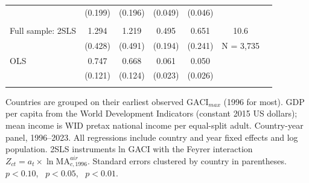 \begin{table}[p]
\begin{threeparttable}
\begin{tabular}{lcccccc}
 & (0.199) & (0.196) & (0.049) & (0.046) & \\
\addlinespace
\multicolumn{6}{l}{\emph{Reference}}\\
Full sample: 2SLS & 1.294\sym{***} & 1.219\sym{**} & 0.495\sym{**} & 0.651\sym{***} & 10.6 \\
 & (0.428) & (0.491) & (0.194) & (0.241) & N = 3{,}735 \\
\quad OLS & 0.747\sym{***} & 0.668\sym{***} & 0.061\sym{***} & 0.050\sym{*} & \\
 & (0.121) & (0.124) & (0.023) & (0.026) & \\
\addlinespace
\bottomrule
\end{tabular}
\begin{tablenotes}\small
\item Countries are grouped on their earliest observed $\mathrm{GACI}_{max}$ (1996 for most). GDP per capita from the World Development Indicators (constant 2015 US dollars); mean income is WID pretax national income per equal-split adult. Country-year panel, 1996--2023. All regressions include country and year fixed effects and log population. 2SLS instruments ln GACI with the Feyrer interaction $Z_{ct}=a_t\times\ln \mathrm{MA}^{air}_{c,1996}$. Standard errors clustered by country in parentheses. \sym{*}~$p<0.10$, \sym{**}~$p<0.05$, \sym{***}~$p<0.01$.
\end{tablenotes}
\end{threeparttable}
\end{table}
